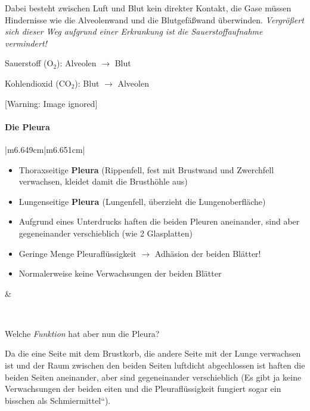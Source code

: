 \documentclass{article}
\newcommand\gSub[1]{\ensuremath{{}_{\text{#1}}}}
\newcommand\gT[1]{\textbf{\textup{\textcolor[rgb]{0.0,0.5019608,0.0}{#1}}}}
\newcommand\gE[1]{\textit{#1}}
\begin{document}
{\mdseries
Dabei besteht zwischen Luft und Blut kein direkter Kontakt, die Gase
m\"ussen Hindernisse wie die Alveolenwand und die Blutgef\"a{\ss}wand
\"uberwinden. \gE{Vergr\"o{\ss}ert sich dieser Weg
aufgrund einer Erkrankung ist die Sauerstoffaufnahme vermindert!} }

{\mdseries
Sauerstoff (O\gSub{2}):   Alveolen ${\rightarrow}$ Blut}

{\mdseries
Kohlendioxid (CO\gSub{2}):  Blut ${\rightarrow}$ Alveolen}

  [Warning: Image ignored] %
 

\paragraph{Die Pleura}
\begin{center}
\tablehead{}\begin{supertabular}{|m{6.649cm}|m{6.651cm}|}
\hline
\begin{itemize}
\item Thoraxseitige \gT{Pleura}%
%
 (Rippenfell, fest mit  Brustwand und Zwerchfell verwachsen, kleidet
damit die Brusth\"ohle aus)

\item Lungenseitige \gT{Pleura }(Lungenfell, \"uberzieht
die Lungenoberfl\"ache)

\item Aufgrund eines Unterdrucks haften die beiden Pleuren aneinander,
sind aber gegeneinander verschieblich (wie 2 Glasplatten)

\item Geringe Menge Pleurafl\"ussigkeit ${\rightarrow}$ Adh\"asion der
beiden Bl\"atter!

\item Normalerweise keine Verwachsungen der beiden Bl\"atter

\end{itemize}
 &
{%
 \par}

\\\hline
\end{supertabular}
\end{center}
{\mdseries\color{black}
Welche \gE{Funktion} hat aber nun die Pleura?}

{\mdseries
Da die eine Seite mit dem Brustkorb, die andere Seite mit der Lunge
verwachsen ist und der Raum zwischen den beiden Seiten luftdicht
abgechlossen ist haften die beiden Seiten aneinander, aber sind
gegeneinander verschieblich (Es gibt ja keine Verwachsungen der beiden
eiten und die Pleurafl\"ussigkeit fungiert sogar ein bisschen als
{\quotedblbase}Schmiermittel{\textquotedblleft}). }
\end{document}
